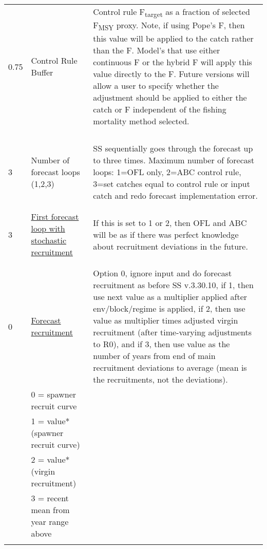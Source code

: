 \begin{landscape}
{\begin{longtable}{p{3.2cm} p{7cm} p{10.8cm}}
 \hline
 0.75 \Tstrut & Control Rule Buffer & \multirow{1}{1cm}[-0.25cm]{\parbox{11cm}{Control rule F\textsubscript{target} as a fraction of selected F\textsubscript{MSY} proxy. Note, if using Pope's F, then this value will be applied to the catch rather than the F.  Model's that use either continuous F or the hybrid F will apply this value directly to the F.  Future versions will allow a user to specify whether the adjustment should be applied to either the catch or F independent of the fishing mortality method selected.}} \\ 
  & & \\
  & & \\
  & & \\
  & & \Bstrut\\
 
 \pagebreak %
 
 3 \Tstrut & Number of forecast loops (1,2,3) & \multirow{1}{1cm}[-0.25cm]{\parbox{11cm}{SS sequentially goes through the forecast up to three times.  Maximum number of forecast loops: 1=OFL only, 2=ABC control rule, 3=set catches equal to control rule or input catch and redo forecast implementation error.}} \\
 & & \\
 & & \Bstrut\Bstrut\\
 
 \hline  
 3 \Tstrut & \hyperlink{appendB}{First forecast loop with stochastic recruitment} & \multirow{1}{1cm}[-0.25cm]{\parbox{11cm}{If this is set to 1 or 2, then OFL and ABC will be as if there was perfect knowledge about recruitment deviations in the future.}} \\
   & & \\
   & & \\
 
 \hline
 0 \Tstrut & \hyperlink{ForeSpawn}{Forecast recruitment} & \multirow{1}{1cm}[-0.25cm]{\parbox{11cm}{Option 0, ignore input and do forecast recruitment as before SS v.3.30.10, if 1, then use next value as a multiplier applied after env/block/regime is applied, if 2, then use value as multiplier times adjusted virgin recruitment (after time-varying adjustments to R0), and if 3, then use value as the number of years from end of main recruitment deviations to average (mean is the recruitments, not the deviations).}} \\
    & 0 = spawner recruit curve & \\
    & 1 = value*(spawner recruit curve) & \\
    & 2 = value*(virgin recruitment) & \\
    & 3 = recent mean from year range above & \\
    & & \\
     

\end{longtable}}
\end{landscape}
